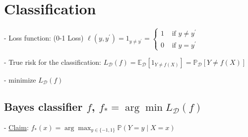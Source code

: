 \section{Classification}









- Loss function: (0-1 Loss) $\ell\left(y, y^{\prime}\right)=1_{y \neq y^{\prime}}= \begin{cases}1 & \text { if } y \neq y^{\prime} \\ 0 & \text { if } y=y^{\prime}\end{cases}$

- True risk for the classification:
$
L_{\mathscr{D}}(f)=\mathbb{E}_{\mathscr{D}}\left[1_{Y \neq f(X)}\right]=\mathbb{P}_{\mathscr{D}}[Y \neq f(X)]
$

- minimize $L_{\mathscr{D}}(f)$

\subsection*{Bayes classifier $f$, $f_{*}=\arg \min L_{\mathscr{D}}(f)$}


- \underline{Claim}:
$
f_{*}(x)=\arg \max _{y \in\{-1,1\}} \mathbb{P}(Y=y \mid X=x)
$


